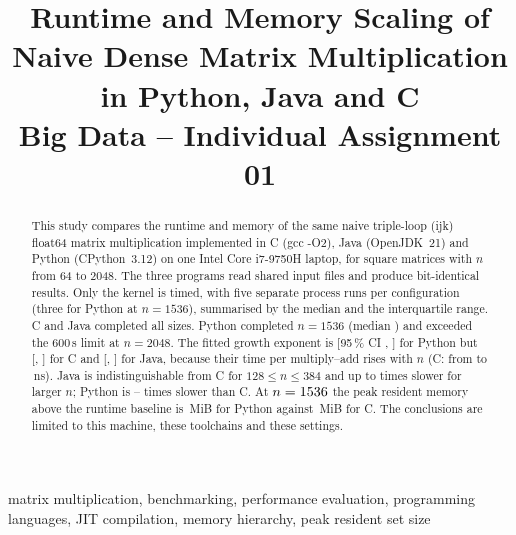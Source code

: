 \documentclass[conference,a4paper]{IEEEtran}
\begin{document}
\title{Runtime and Memory Scaling of Naive Dense Matrix Multiplication in Python, Java and C\\[0.3em]
\large Big Data -- Individual Assignment 01}

\author{
}

\maketitle

\begin{abstract}
This study compares the runtime and memory of the same naive triple-loop (ijk) float64 matrix multiplication
implemented in C (gcc -O2), Java (OpenJDK~21) and Python (CPython~3.12) on one Intel Core i7-9750H laptop, for
square matrices with $n$ from 64 to 2048. The three programs read shared input files and produce bit-identical
results. Only the kernel is timed, with five separate process runs per configuration (three for Python at $n=1536$), summarised by the median and
the interquartile range. C and Java completed all sizes. Python completed $n=1536$ (median
\TPythonFifteenThirtySix) and exceeded the 600\,s limit at $n=2048$. The fitted growth exponent is
\ExpPython{} [95\,\% CI \ExpPythonLo, \ExpPythonHi] for Python but \ExpC{} [\ExpCLo, \ExpCHi] for C and
\ExpJava{} [\ExpJavaLo, \ExpJavaHi] for Java, because their time per multiply--add rises with $n$ (C: from
\NsMaddCMin{} to \NsMaddCMax\,ns). Java is indistinguishable from C for $128\le n\le384$ and up to
\RatioJavaMax{} times slower for larger $n$; Python is \RatioPythonMin--\RatioPythonMax{} times slower than C. At
$n=1536$ the peak resident memory above the runtime baseline is \RssNetCommonPython{}\,MiB for Python
against \RssNetCommonC{}\,MiB for C. The conclusions are limited to this machine, these toolchains and these
settings.
\end{abstract}

\begin{IEEEkeywords}
matrix multiplication, benchmarking, performance evaluation, programming languages, JIT compilation,
memory hierarchy, peak resident set size
\end{IEEEkeywords}
\end{document}
